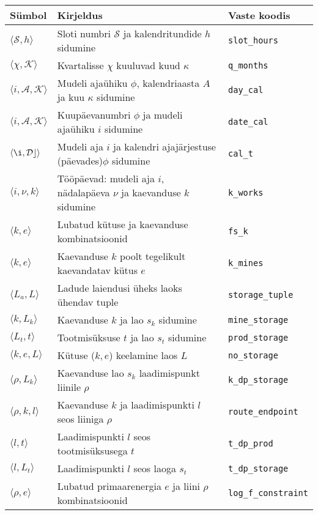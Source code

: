 \begin{table}
\begin{tabular}{l l l}
Sümbol & Kirjeldus & Vaste koodis\\
\hline
$\langle \mathcal{S}, h \rangle$ & Sloti numbri $\mathcal{S}$ ja kalendritundide $h$ sidumine & \texttt{slot\_hours} \\
$\langle \chi, \mathcal{K} \rangle$ & Kvartalisse $\chi$ kuuluvad kuud $\kappa$ & \texttt{q\_months} \\
$\langle i, \mathcal{A}, \mathcal{K} \rangle$& Mudeli ajaühiku $\phi$, kalendriaasta $A$ ja kuu $\kappa$ sidumine& \texttt{day\_cal} \\
$\langle i, \mathcal{A}, \mathcal{K} \rangle$& Kuupäevanumbri $\phi$ ja mudeli ajaühiku $i$ sidumine & \texttt{date\_cal} \\
$\langle \i, \mathcal{Dc} \rangle$& Mudeli aja $i$ ja kalendri ajajärjestuse (päevades)$\phi$ sidumine & \texttt{cal\_t} \\
$\langle i, \nu, k \rangle$& Tööpäevad: mudeli aja $i$, nädalapäeva $\nu$ ja kaevanduse $k$ sidumine & \texttt{k\_works} \\

$\langle k, e \rangle$      & Lubatud kütuse ja kaevanduse kombinatsioonid & \texttt{fs\_k} \\ 
$\langle k, e \rangle$      & Kaevanduse $k$ poolt tegelikult kaevandatav kütus $e$ & \texttt{k\_mines} \\ 

$\langle L_a, L \rangle$    & Ladude laiendusi üheks laoks ühendav tuple & \texttt{storage\_tuple}\\
$\langle k, L_k \rangle$    & Kaevanduse $k$ ja lao $s_k$ sidumine  & \texttt{mine\_storage}\\
$\langle L_t, t \rangle$    & Tootmisüksuse $t$ ja lao $s_t$ sidumine  & \texttt{prod\_storage}\\
$\langle k, e, L \rangle$   & Kütuse ($k,e$) keelamine laos $L$  & \texttt{no\_storage}\\
$\langle \rho, L_k \rangle$ & Kaevanduse lao $s_k$ laadimispunkt liinile $\rho$  & \texttt{k\_dp\_storage}\\
$\langle \rho, k, l \rangle$& Kaevanduse $k$ ja laadimispunkti $l$ seos liiniga $\rho$  & \texttt{route\_endpoint}\\
$\langle l, t \rangle$      & Laadimispunkti $l$ seos tootmisüksusega $t$& \texttt{t\_dp\_prod}\\                       
$\langle l, L_t \rangle$    & Laadimispunkti $l$ seos laoga $s_t$ & \texttt{t\_dp\_storage}\\
$\langle \rho, e \rangle$   & Lubatud primaarenergia $e$ ja liini $\rho$ kombinatsioonid & \texttt{log\_f\_constraint}\\


\end{tabular}
\end{table}
